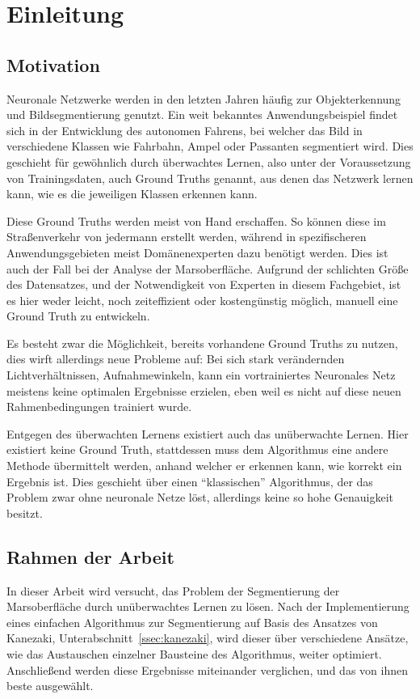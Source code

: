 \chapter{Einleitung}
\label{chap:einleitung}

\section{Motivation}
\label{sec:motivation}

Neuronale Netzwerke werden in den letzten Jahren häufig zur Objekterkennung und Bildsegmentierung genutzt. Ein weit bekanntes Anwendungsbeispiel findet sich in der Entwicklung des autonomen Fahrens, bei welcher das Bild in verschiedene Klassen wie \zB Fahrbahn, Ampel oder Passanten segmentiert wird. Dies geschieht für gewöhnlich durch überwachtes Lernen, also unter der Voraussetzung von Trainingsdaten, auch Ground Truths genannt, aus denen das Netzwerk lernen kann, wie es die jeweiligen Klassen erkennen kann.

Diese Ground Truths werden meist von Hand erschaffen. So können diese im Straßenverkehr von jedermann erstellt werden, während in spezifischeren Anwendungsgebieten meist Domänenexperten dazu benötigt werden. Dies ist auch der Fall bei der Analyse der Marsoberfläche. Aufgrund der schlichten Größe des Datensatzes, und der Notwendigkeit von Experten in diesem Fachgebiet, ist es hier weder leicht, noch zeiteffizient oder kostengünstig möglich, manuell eine Ground Truth zu entwickeln.

Es besteht zwar die Möglichkeit, bereits vorhandene Ground Truths zu nutzen, dies wirft allerdings neue Probleme auf: Bei \bspw sich stark verändernden Lichtverhältnissen, Aufnahmewinkeln, \oa kann ein vortrainiertes Neuronales Netz meistens keine optimalen Ergebnisse erzielen, eben weil es nicht auf diese neuen Rahmenbedingungen trainiert wurde.

Entgegen des überwachten Lernens existiert auch das unüberwachte Lernen. Hier existiert keine Ground Truth, stattdessen muss dem Algorithmus eine andere Methode übermittelt werden, anhand welcher er erkennen kann, wie korrekt ein Ergebnis ist. Dies geschieht \zB über einen \enquote{klassischen} Algorithmus, der das Problem zwar ohne neuronale Netze löst, allerdings keine so hohe Genauigkeit besitzt.

\section{Rahmen der Arbeit}
\label{sec:rahmen}

In dieser Arbeit wird versucht, das Problem der Segmentierung der Marsoberfläche durch unüberwachtes Lernen zu lösen. Nach der Implementierung eines einfachen Algorithmus zur Segmentierung auf Basis des Ansatzes von Kanezaki\cite{kanezaki_18}, \vgl Unterabschnitt~\ref{ssec:kanezaki}, wird dieser über verschiedene Ansätze, wie \zB das Austauschen einzelner Bausteine des Algorithmus, weiter optimiert. Anschließend werden diese Ergebnisse miteinander verglichen, und das von ihnen beste ausgewählt.